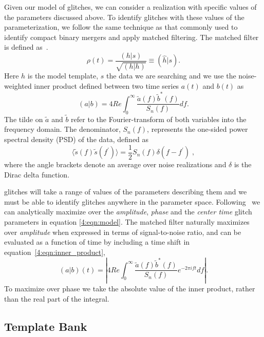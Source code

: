 Given our model of \scl{} glitches, we can consider a realization with specific values of the parameters discussed above. To identify glitches with these values of the parameterization, we follow the same technique as that commonly used to identify compact binary mergers and apply matched filtering. The matched filter is defined as~\cite{FINDCHIRP:2012}. 
%
\begin{equation}
  \rho(t) = \frac{(h | s)}{\sqrt{(h | h)}} \equiv (\hat{h} | s).
  \label{4:eqn:mf_1}
\end{equation}
%
Here $h$ is the model template, $s$ the \gw{} data we are searching and we use the noise-weighted inner product defined between two time series $a(t)$ and $b(t)$ as
%
\begin{equation}
  (a | b) = 4 Re \int^{\infty}_{0} \frac{\tilde{a}(f) \tilde{b}^*(f)}{S_n(f)} 
  df.
  \label{4:eqn:inner_product}
\end{equation}
%
The tilde on $\tilde{a}$ and $\tilde{b}$ refer to the Fourier-transform of both variables into the frequency domain. The denominator, $S_n(f)$, represents the one-sided power spectral density (PSD) of the data, defined as
%
\begin{equation}
  \langle \tilde{s}(f) \tilde{s}(f^\prime) \rangle = \frac{1}{2} S_n(f) \delta(f - f^\prime) \;,
  \label{4:eqn:psd}
\end{equation}
%
where the angle brackets denote an average over noise realizations and $\delta$ is the Dirac delta function.

\Scl{} glitches will take a range of values of the parameters describing them and we must be able to identify glitches anywhere in the parameter space. Following~\cite{FINDCHIRP:2012} we can analytically maximize over the \emph{amplitude}, \emph{phase} and the \emph{center time} glitch parameters in equation \ref{4:eqn:model}. The matched filter naturally maximizes over \emph{amplitude} when expressed in terms of signal-to-noise ratio, and can be evaluated as a function of time by including a time shift in equation~\ref{4:eqn:inner_product},
%
\begin{equation}
  (a | b)(t) = \left| 4 Re \int^{\infty}_{0} \frac{\tilde{a}(f) \tilde{b}^*(f)}{S_n(f)} 
  e^{-2 \pi i f t} 
  df \right|.
  \label{4:eqn:inner_product_time}
\end{equation}
%
To maximize over phase we take the absolute value of the inner product, rather than the real part of the integral.

\subsection{Template Bank}

